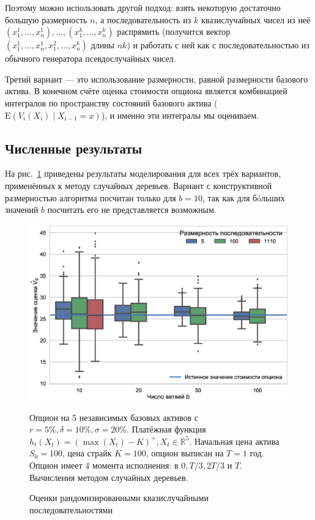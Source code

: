 \documentclass[specialist,
               substylefile = ../spbu.rtx,
               subf,href,colorlinks=true, 10pt]{disser}
\newcommand{\E}{\mathrm{E}}
\begin{document}
Поэтому можно использовать другой подход: взять некоторую достаточно большую размерность $n$, а последовательность из $k$ квазислучайных чисел из неё $\left(x_1^1, \dots, x_n^1\right), \dots, \left(x_1^k, \dots, x_n^k\right)$ распрямить (получится вектор $\left(x_1^1, \dots, x_n^1, x_1^2, \dots, x_n^k\right)$ длины $nk$) и работать с ней как с последовательностью из обычного генератора псевдослучайных чисел.

Третий вариант --- это использование размерности, равной размерности базового актива. В конечном счёте оценка стоимости опциона является комбинацией интегралов по пространству состояний базового актива ($\E\left(V_i(X_i)\middle\vert X_{i-1} = x\right)$), и именно эти интегралы мы оцениваем.


\subsection{Численные результаты} %
\label{sub:numerical_results}

На рис.~\ref{fig:halton_estimators} приведены результаты моделирования для всех трёх вариантов, применённых к методу случайных деревьев. Вариант с конструктивной размерностью алгоритма посчитан только для $b = 10$, так как для б\'oльших значений $b$ посчитать его не представляется возможным.

\begin{figure}[h]
    \centering
	\includegraphics[width=\textwidth]{halton_estimators.eps}
	\caption{Оценки рандомизированными квазислучайными последовательностями}
	\footnotesize Опцион на 5 независимых базовых активов с $r = 5\%, \delta = 10\%, \sigma = 20\%$. Платёжная функция $h_t(X_t) = \left(\max(X_t) - K\right)^+, X_t\in \mathbb R^5$. Начальная цена актива $S_0 = 100$, цена страйк $K = 100$, опцион выписан на $T=1$ год. Опцион имеет 4 момента исполнения: в $0, T/3, 2T/3$ и $T$. Вычисления методом случайных деревьев.
	\label{fig:halton_estimators}
\end{figure}
\end{document}
